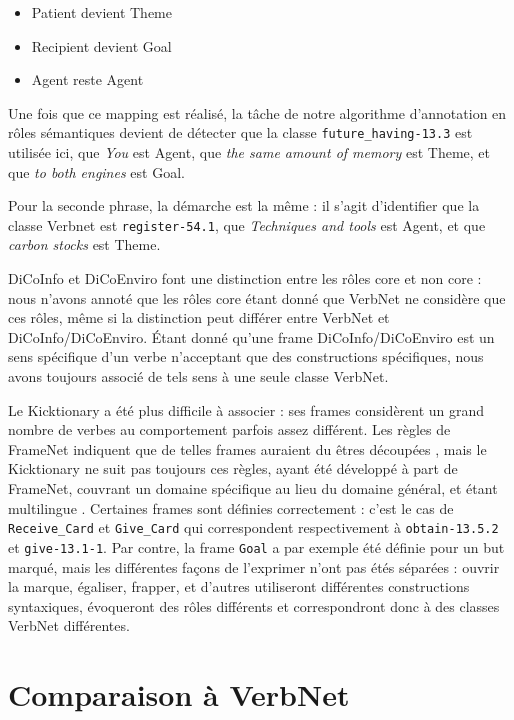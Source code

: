 \begin{itemize}
    \item Patient devient Theme
    \item Recipient devient Goal
    \item Agent reste Agent
\end{itemize}

Une fois que ce mapping est réalisé, la tâche de notre algorithme d'annotation
en rôles sémantiques devient de détecter que la classe \texttt{future\_having-13.3} est
utilisée ici, que \textit{You} est Agent, que \textit{the same amount of memory} est Theme,
et que \textit{to both engines} est Goal.

Pour la seconde phrase, la démarche est la même : il s'agit d'identifier que la
classe Verbnet est \texttt{register-54.1}, que \textit{Techniques and tools}
est Agent, et que \textit{carbon stocks} est Theme.

DiCoInfo et DiCoEnviro font une distinction entre les rôles core et non core :
nous n'avons annoté que les rôles core étant donné que VerbNet ne considère que
ces rôles, même si la distinction peut différer entre VerbNet et
DiCoInfo/DiCoEnviro. Étant donné qu'une frame DiCoInfo/DiCoEnviro est un sens
spécifique d'un verbe n'acceptant que des constructions spécifiques, nous avons
toujours associé de tels sens à une seule classe VerbNet.

Le Kicktionary a été plus difficile à associer : ses frames considèrent un
grand nombre de verbes au comportement parfois assez différent. Les règles de
FrameNet indiquent que de telles frames auraient du êtres découpées
\citep{ruppenhofer2006extended}, mais le Kicktionary ne suit pas toujours ces
règles, ayant été développé à part de FrameNet, couvrant un domaine spécifique
au lieu du domaine général, et étant multilingue
\citep{schmidt2006interfacing}. Certaines frames sont définies correctement :
c'est le cas de \texttt{Receive\_Card} et \texttt{Give\_Card} qui correspondent
respectivement à \texttt{obtain-13.5.2} et \texttt{give-13.1-1}. Par contre, la
frame \texttt{Goal} a par exemple été définie pour un but marqué, mais les
différentes façons de l'exprimer n'ont pas étés séparées : ouvrir la marque,
égaliser, frapper, et d'autres utiliseront différentes constructions
syntaxiques, évoqueront des rôles différents et correspondront donc à des
classes VerbNet différentes.

\section{Comparaison à VerbNet}

